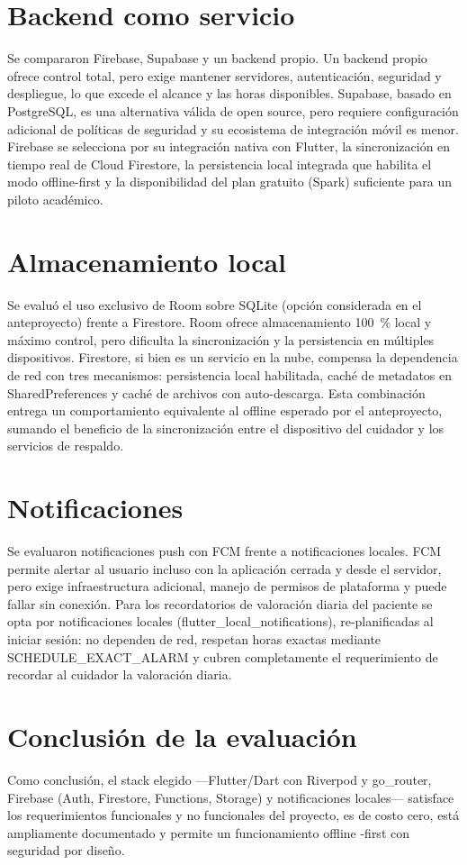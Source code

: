 \section{Backend como servicio}

Se compararon Firebase, Supabase y un backend propio. Un backend propio ofrece
control total, pero exige mantener servidores, autenticación, seguridad y
despliegue, lo que excede el alcance y las horas disponibles. Supabase, basado
en PostgreSQL, es una alternativa válida de open source, pero requiere
configuración adicional de políticas de seguridad y su ecosistema de integración
móvil es menor. Firebase se selecciona por su integración nativa con Flutter, la
sincronización en tiempo real de Cloud Firestore, la persistencia local
integrada que habilita el modo offline-first y la disponibilidad del plan
gratuito (Spark) suficiente para un piloto académico.

\section{Almacenamiento local}

Se evaluó el uso exclusivo de Room sobre SQLite (opción considerada en el
anteproyecto) frente a Firestore. Room ofrece almacenamiento 100~\% local y
máximo control, pero dificulta la sincronización y la persistencia en múltiples
dispositivos. Firestore, si bien es un servicio en la nube, compensa la
dependencia de red con tres mecanismos: persistencia local habilitada, caché de
metadatos en SharedPreferences y caché de archivos con auto-descarga. Esta
combinación entrega un comportamiento equivalente al offline esperado por el
anteproyecto, sumando el beneficio de la sincronización entre el dispositivo del
cuidador y los servicios de respaldo.

\section{Notificaciones}

Se evaluaron notificaciones push con FCM frente a notificaciones locales. FCM
permite alertar al usuario incluso con la aplicación cerrada y desde el
servidor, pero exige infraestructura adicional, manejo de permisos de plataforma
y puede fallar sin conexión. Para los recordatorios de valoración diaria del
paciente se opta por notificaciones locales (flutter\_local\_notifications),
re-planificadas al iniciar sesión: no dependen de red, respetan horas exactas
mediante SCHEDULE\_EXACT\_ALARM y cubren completamente el requerimiento
de recordar al cuidador la valoración diaria.

\section{Conclusión de la evaluación}

Como conclusión, el stack elegido —Flutter/Dart con Riverpod y go\_router,
Firebase (Auth, Firestore, Functions, Storage) y notificaciones locales—
satisface los requerimientos funcionales y no funcionales del proyecto, es de
costo cero, está ampliamente documentado y permite un funcionamiento offline
-first con seguridad por diseño.